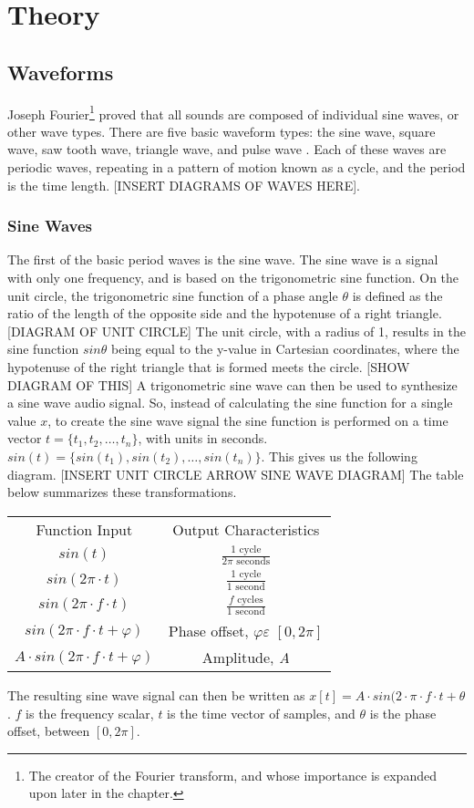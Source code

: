 \chapter[Theory]{Theory}\label{theory}

\section{Waveforms}
Joseph Fourier\footnote{The creator of the Fourier transform, and whose importance is expanded upon later in the chapter.} proved that all sounds are composed of individual sine waves, or other wave types. There are five basic waveform types: the sine wave, square wave, saw tooth wave, triangle wave, and pulse wave \cite{Winer_2018}. Each of these waves are periodic waves, repeating in a pattern of motion known as a cycle, and the period is the time length. [INSERT DIAGRAMS OF WAVES HERE]. 

\subsection{Sine Waves}
The first of the basic period waves is the sine wave. The sine wave is a signal with only one frequency, and is based on the trigonometric sine function. On the unit circle, the trigonometric sine function of a phase angle $\theta$ is defined as the ratio of the length of the opposite side and the hypotenuse of a right triangle. [DIAGRAM OF UNIT CIRCLE] The unit circle, with a radius of 1, results in the sine function $sin\theta$ being equal to the y-value in Cartesian coordinates, where the hypotenuse of the right triangle that is formed meets the circle. [SHOW DIAGRAM OF THIS] A trigonometric sine wave can then be used to synthesize a sine wave audio signal. So, instead of calculating the sine function for a single value $x$, to create the sine wave signal the sine function is performed on a time vector $t = \{t_1, t_2, \dots, t_n\}$, with units in seconds. $sin(t) = \{sin(t_1), sin(t_2), \dots, sin(t_n)\}$. This gives us the following diagram. [INSERT UNIT CIRCLE ARROW SINE WAVE DIAGRAM] The table below summarizes these transformations.
\begin{center}
    \begin{tabular}{c c}
        Function Input & Output Characteristics \\
        $sin(t)$ & $\frac{1 \textrm{ cycle}}{2\pi \textrm{ seconds}}$\\
        $sin(2\pi \cdot t)$ & $\frac{1 \textrm{ cycle}}{1 \textrm{ second}}$\\
        $sin(2\pi \cdot f \cdot t)$ & $\frac{f \textrm{ cycles}}{1 \textrm{ second}}$\\
        $sin(2\pi \cdot f \cdot t + \varphi)$ & Phase offset, $\varphi \varepsilon$ $[0, 2\pi]$\\
        $A \cdot sin(2\pi \cdot f \cdot t + \varphi)$ & Amplitude, \textit{A}
    \end{tabular}
\end{center}
The resulting sine wave signal can then be written as $x[t] = A \cdot sin(2 \cdot \pi \cdot f \cdot t + \theta$. $f$ is the frequency scalar, $t$ is the time vector of samples, and $\theta$ is the phase offset, between $[0, 2\pi]$.

